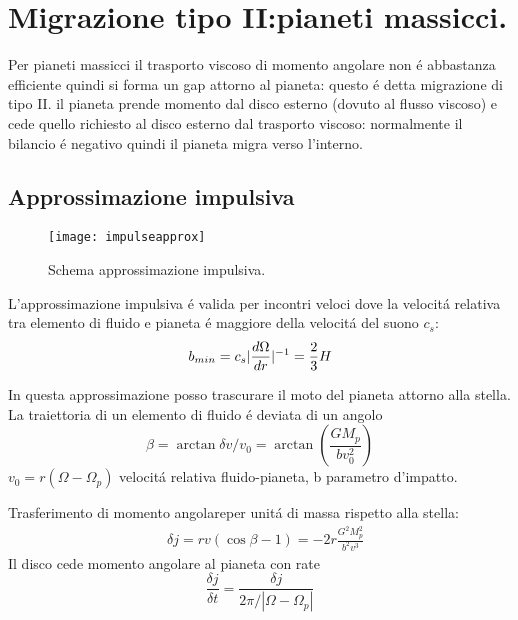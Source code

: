 \section{Migrazione tipo II:pianeti massicci.}

Per pianeti massicci il trasporto viscoso di momento angolare non \'e abbastanza efficiente quindi si forma un gap attorno al pianeta: questo \'e detta migrazione di tipo II. il pianeta prende momento dal disco esterno (dovuto al flusso viscoso) e cede quello richiesto al disco esterno dal trasporto viscoso: normalmente il bilancio \'e negativo quindi il pianeta migra verso l'interno.

\cleardoublepage

\subsection{Approssimazione impulsiva}

\begin{wrapfigure}[7]{l}{0.45\textwidth}
\texttt{[image: impulseapprox]}
\caption{Schema approssimazione impulsiva.}\label{fig:impulseapprox}
\end{wrapfigure}

L'approssimazione impulsiva \'e valida per incontri veloci dove la velocit\'a relativa tra elemento di fluido e pianeta \'e maggiore della velocit\'a del suono $c_s$:
\begin{equation}b_{min}=c_s|\frac{d \Omega}{d r}|^{-1}=\frac{2}{3}H\end{equation}

In questa approssimazione posso trascurare il moto del pianeta attorno alla stella. La traiettoria di un elemento di fluido \'e deviata di un angolo
\begin{equation}
\beta=\arctan{\delta v/v_0}=\arctan{(\frac{GM_p}{bv_0^2})}
\end{equation}
$v_0=r(\Omega-\Omega_p)$ velocit\'a relativa fluido-pianeta, b parametro d'impatto.

Trasferimento di momento angolareper unit\'a di massa rispetto alla stella:
\begin{align}
&\delta j=rv(\cos{\beta}-1)=-2r\frac{G^2M_p^2}{b^2v^3}
\end{align}
Il disco cede momento angolare al pianeta con rate
\begin{equation}
\frac{\delta j}{\delta t}=\frac{\delta j}{2\pi/|\Omega-\Omega_p|}
\end{equation}

